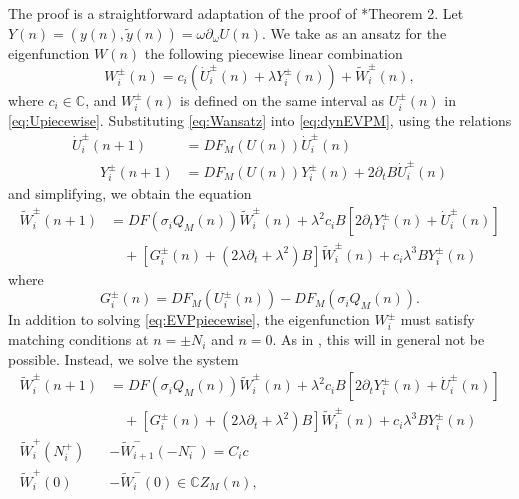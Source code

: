 \documentclass[12pt,reqno]{amsart}
\def\C{{\mathbb C}}
\theoremstyle{definition}
\begin{document}
The proof is a straightforward adaptation of the proof of \cite{Parker2020}*{Theorem 2}. Let $Y(n) = (y(n), \tilde{y}(n)) = \omega \partial_\omega U(n)$. We take as an ansatz for the eigenfunction $W(n)$ the following piecewise linear combination
\begin{equation}\label{eq:Wansatz}
W_i^\pm(n) = c_i ( \dot{U}_i^\pm(n) + \lambda Y_i^\pm(n) ) + \tilde{W}_i^\pm(n),
\end{equation}
where $c_i \in \C$, and $W_i^\pm(n)$ is defined on the same interval as $U_i^\pm(n)$ in \cref{eq:Upiecewise}. Substituting \cref{eq:Wansatz} into \cref{eq:dynEVPM}, using the relations
\begin{equation}
\begin{aligned}
\dot{U}_i^\pm(n+1) &= DF_M(U(n))\dot{U}_i^\pm(n) \\ 
\qquad Y_i^\pm(n+1) &= DF_M(U(n)) Y_i^\pm(n) + 2 \partial_t B \dot{U}_i^\pm(n)
\end{aligned}
\end{equation}
and simplifying, we obtain the equation
\begin{equation}\label{eq:EVPpiecewise}
\begin{aligned}
\tilde{W}_i^\pm(n+1) &= DF(\sigma_i Q_M(n)) \tilde{W}_i^\pm(n) + \lambda^2 c_i B[ 2 \partial_t Y_i^\pm(n) + \dot{U}_i^\pm(n)] \\
&\quad+ [G_i^\pm(n) + (2 \lambda \partial_t + \lambda^2) B] \tilde{W}_i^\pm(n) + c_i \lambda^3 B Y_i^\pm(n)
\end{aligned}
\end{equation}
where
\begin{equation}\label{eq:Gipm}
G_i^\pm(n) = DF_M(U_i^\pm(n)) - DF_M(\sigma_i Q_M(n)).
\end{equation}
In addition to solving \cref{eq:EVPpiecewise}, the eigenfunction $W_i^\pm$ must satisfy matching conditions at $n = \pm N_i$ and $n = 0$. As in \cites{Parker2020,Parker2021,Sandstede1998}, this will in general not be possible. Instead, we solve the system 
\begin{equation}\label{eq:EVPsystem}
\begin{aligned}
\tilde{W}_i^\pm(n+1) &= DF(\sigma_i Q_M(n)) \tilde{W}_i^\pm(n) + \lambda^2 c_i B[ 2 \partial_t Y_i^\pm(n) + \dot{U}_i^\pm(n)] \\
&\quad+ [G_i^\pm(n) + (2 \lambda \partial_t + \lambda^2) B] \tilde{W}_i^\pm(n) + c_i \lambda^3 B Y_i^\pm(n) \\
\tilde{W}_i^+(N_i^+) &- \tilde{W}_{i+1}^-(-N_i^-) = C_i c \\
\tilde{W}_i^+(0) &- \tilde{W}_i^-(0) \in \C Z_M(n),
\end{aligned}
\end{equation}
\end{document}
